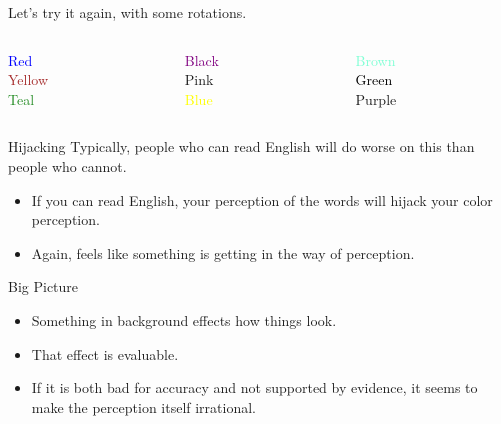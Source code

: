 \documentclass[
  17pt,
  letterpaper,
  ignorenonframetext,
  aspectratio=169,
  xcolor={dvipsnames}]{beamer}
\providecommand{\tightlist}{%
  \setlength{\itemsep}{0pt}\setlength{\parskip}{0pt}}\usepackage{longtable,booktabs,array}
\begin{document}
\begin{frame}[plain]
Let's try it again, with some rotations.

\end{frame} \begin{frame}[plain]

\begin{columns}[T]
\begin{column}{0.25\textwidth}
\LARGE{ \textcolor{Blue}{Red} \\ \textcolor{Brown}{Yellow}  \\ \textcolor{ForestGreen}{Teal} }
\end{column}

\begin{column}{0.25\textwidth}
\LARGE{  \textcolor{Purple}{Black}    \\  \textcolor{BrickRed}{Pink}    \\     \textcolor{Yellow}{Blue} }
\end{column}

\begin{column}{0.25\textwidth}
\LARGE{  \textcolor{Aquamarine}{Brown} \\  \textcolor{Black}{Green} \\  \textcolor{Rhodamine}{Purple} }
\end{column}
\end{columns}
\end{frame}

\begin{frame}{Hijacking}
\protect\hypertarget{hijacking}{}
Typically, people who can read English will do worse on this than people
who cannot.

\begin{itemize}[<+->]
\tightlist
\item
  If you can read English, your perception of the words will hijack your
  color perception.
\item
  Again, feels like something is getting in the way of perception.
\end{itemize}
\end{frame}

\begin{frame}{Big Picture}
\protect\hypertarget{big-picture}{}
\begin{itemize}[<+->]
\tightlist
\item
  Something in background effects how things look.
\item
  That effect is evaluable.
\item
  If it is both bad for accuracy and not supported by evidence, it seems
  to make the perception itself irrational.
\end{itemize}
\end{frame}
\end{document}
